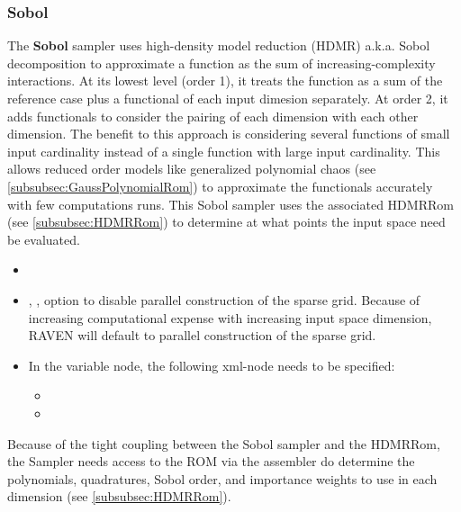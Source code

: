 \subsubsection{Sobol}
\label{subsubsubsec:SobolSampler}
The \textbf{Sobol} sampler uses high-density model reduction (HDMR) a.k.a. Sobol decomposition to approximate a function as the sum of increasing-complexity
interactions.  At its lowest level (order 1), it treats the function as a sum of the reference case plus a functional of each input dimesion separately.  At
order 2, it adds functionals to consider the pairing of each dimension with each other dimension.  The benefit to this approach is considering several functions
of small input cardinality instead of a single function with large input cardinality.  This allows reduced order models like generalized polynomial chaos
(see \ref{subsubsec:GaussPolynomialRom}) to approximate the functionals accurately with few computations runs.  This Sobol sampler uses the associated HDMRRom
(see \ref{subsubsec:HDMRRom}) to determine at what points the input space need be evaluated.

\begin{itemize}
\itemsep0em
\item \nameDescription
\item {}, , option to disable parallel construction of the sparse grid.  Because of increasing computational expense with increasing input space dimension, RAVEN will default to parallel construction of the sparse grid.
\end{itemize}
\begin{itemize}
\item \variableDescription
 In the variable node, the following xml-node needs to be specified:
 \begin{itemize}
    \item \distributionDescription
    \item \functionDescription
 \end{itemize} \end{itemize}
Because of the tight coupling between the Sobol sampler and the HDMRRom, the Sampler needs access to the ROM via the assembler do determine the polynomials, quadratures, Sobol order, and importance weights to use in each dimension (see \ref{subsubsec:HDMRRom}).

